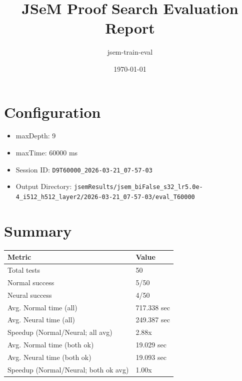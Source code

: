 \documentclass[a4paper,10pt]{article}
\title{JSeM Proof Search Evaluation Report}
\author{jsem-train-eval}
\date{\today}
\begin{document}
\maketitle

\section{Configuration}
\begin{itemize}
\item maxDepth: 9
\item maxTime: 60000 ms
\item Session ID: \texttt{D9T60000\_2026-03-21\_07-57-03}
\item Output Directory: \texttt{jsemResults/jsem\_biFalse\_s32\_lr5.0e-4\_i512\_h512\_layer2/2026-03-21\_07-57-03/eval\_T60000}
\end{itemize}

\section{Summary}
\begin{tabular}{ll}
\toprule
\textbf{Metric} & \textbf{Value} \\
\midrule
Total tests & 50 \\
Normal success & 5/50 \\
Neural success & 4/50 \\
\midrule
Avg. Normal time (all) & 717.338 sec \\
Avg. Neural time (all) & 249.387 sec \\
Speedup (Normal/Neural; all avg) & 2.88x \\
Avg. Normal time (both ok) & 19.029 sec \\
Avg. Neural time (both ok) & 19.093 sec \\
Speedup (Normal/Neural; both ok avg) & 1.00x \\
\bottomrule
\end{tabular}
\end{document}
